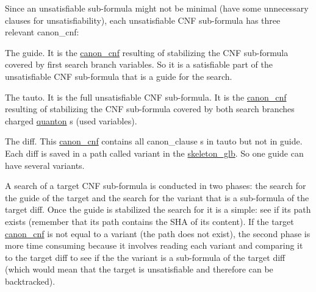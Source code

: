 Since an unsatisfiable sub-\/formula might not be minimal (have some unnecessary clauses for unsatisfiability), each unsatisfiable C\+NF sub-\/formula has three relevant canon\+\_\+cnf\+:


\begin{DoxyItemize}
\item The guide. It is the \hyperlink{classcanon__cnf}{canon\+\_\+cnf} resulting of stabilizing the C\+NF sub-\/formula covered by first search branch variables. So it is a satisfiable part of the unsatisfiable C\+NF sub-\/formula that is a \textquotesingle{}\textquotesingle{}guide\textquotesingle{}\textquotesingle{} for the search.


\item The tauto. It is the full unsatisfiable C\+NF sub-\/formula. It is the \hyperlink{classcanon__cnf}{canon\+\_\+cnf} resulting of stabilizing the C\+NF sub-\/formula covered by both search branches charged \hyperlink{classquanton}{quanton} s (used variables).


\item The diff. This \hyperlink{classcanon__cnf}{canon\+\_\+cnf} contains all canon\+\_\+clause s in tauto but not in guide. Each diff is saved in a path called \textquotesingle{}variant\textquotesingle{} in the \hyperlink{classskeleton__glb}{skeleton\+\_\+glb}. So one guide can have several variants. 
\end{DoxyItemize}

A search of a target C\+NF sub-\/formula is conducted in two phases\+: the search for the guide of the target and the search for the variant that is a sub-\/formula of the target diff. Once the guide is stabilized the search for it is a simple\+: \textquotesingle{}\textquotesingle{}see if its path exists\textquotesingle{}\textquotesingle{} (remember that its path contains the S\+HA of its content). If the target \hyperlink{classcanon__cnf}{canon\+\_\+cnf} is not equal to a variant (the path does not exist), the second phase is more time consuming because it involves reading each variant and comparing it to the target diff to see if the the variant is a sub-\/formula of the target diff (which would mean that the target is unsatisfiable and therefore can be backtracked). 